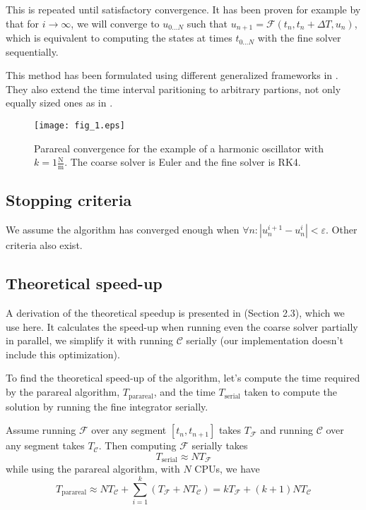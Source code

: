 \documentclass[conference]{IEEEtran}
\begin{document}
This is repeated until satisfactory convergence. It has been proven for example by \cite{parareal2} that for $i \to \infty$, we will converge to $u_{0\dots N}$ such that $u_{n+1} = \mathcal{F}(t_n, t_n+\Delta T, u_n)$, which is equivalent to computing the states at times $t_{0\dots N}$ with the fine solver sequentially.

This method has been formulated using different generalized frameworks in \cite{parareal2}. They also extend the time interval paritioning to arbitrary partions, not only equally sized ones as in \cite{parareal}.

\begin{figure}[htbp]
\centerline{\texttt{[image: fig\_1.eps]}}
\caption{Parareal convergence for the example of a harmonic oscillator with $k = 1\frac{\text{N}}{\text{m}}$. The coarse solver is Euler and the fine solver is RK4.}
\label{oscillator}
\end{figure}

\subsection*{Stopping criteria}
We assume the algorithm has converged enough when $\forall n\colon |u^{i+1}_n - u^i_n| < \varepsilon$. Other criteria also exist. \cite{speedup}

\subsection*{Theoretical speed-up}

A derivation of the theoretical speedup is presented in \cite{speedup} (Section 2.3), which we use here. It calculates the speed-up when running even the coarse solver partially in parallel, we simplify it with running $\mathcal{C}$ serially (our implementation doesn't include this optimization). 

To find the theoretical speed-up of the algorithm, let's compute the time required by the parareal algorithm, $T_\text{parareal}$, and the time $T_\text{serial}$ taken to compute the solution by running the fine integrator serially. 

Assume running $\mathcal{F}$ over any segment $[t_n, t_{n+1}]$ takes $T_\mathcal{F}$ and running $\mathcal{C}$ over any segment takes $T_\mathcal{C}$. Then computing $\mathcal{F}$ serially takes
$$
T_\text{serial} \approx NT_\mathcal{F}
$$
while using the parareal algorithm, with $N$ CPUs, we have
$$
T_\text{parareal} \approx NT_\mathcal{C} + \sum_{i=1}^{k}\left(T_\mathcal{F} + NT_\mathcal{C}\right) = kT_\mathcal{F} + (k+1)NT_\mathcal{C}
$$
\end{document}
